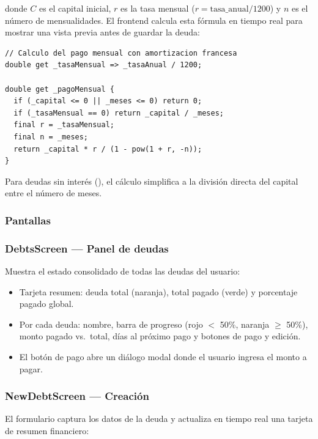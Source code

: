 donde $C$ es el capital inicial, $r$ es la tasa mensual
($r = \text{tasa\_anual} / 1200$) y $n$ es el número de mensualidades.
El frontend calcula esta fórmula en tiempo real para mostrar una vista
previa antes de guardar la deuda:

\begin{lstlisting}[style=dart,
    caption={Cálculo del pago mensual con amortización francesa}]
// Calculo del pago mensual con amortizacion francesa
double get _tasaMensual => _tasaAnual / 1200;

double get _pagoMensual {
  if (_capital <= 0 || _meses <= 0) return 0;
  if (_tasaMensual == 0) return _capital / _meses;
  final r = _tasaMensual;
  final n = _meses;
  return _capital * r / (1 - pow(1 + r, -n));
}
\end{lstlisting}

Para deudas sin interés (), el cálculo simplifica
a la división directa del capital entre el número de meses.

\subsubsection{Pantallas}

\subsubsection*{DebtsScreen — Panel de deudas}

Muestra el estado consolidado de todas las deudas del usuario:

\begin{itemize}
  \item Tarjeta resumen: deuda total (naranja), total pagado (verde) y
        porcentaje pagado global.
  \item Por cada deuda: nombre, barra de progreso (rojo $<$ 50\%,
        naranja $\geq$ 50\%), monto pagado vs.\ total, días al próximo
        pago y botones de pago y edición.
  \item El botón de pago abre un diálogo modal donde el usuario ingresa
        el monto a pagar.
\end{itemize}

\subsubsection*{NewDebtScreen — Creación}

El formulario captura los datos de la deuda y actualiza en tiempo real
una tarjeta de resumen financiero:

